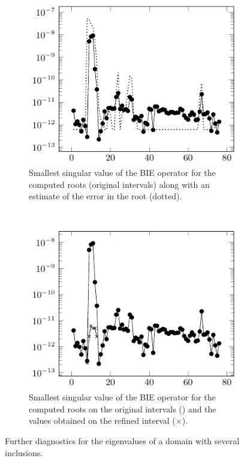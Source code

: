 %

\begin{figure}
  \centering
  \begin{subfigure}[t]{0.4\textwidth}
    \centering
    \includegraphics[width=\textwidth]{fig/ex_many_holes_004_sings_plot_west}
    \caption{Smallest singular value of the BIE operator
      for the computed roots (original intervals)
      along with an estimate of the error in the root (dotted).}
    \label{subfig:many_inclusions_sings_west}
  \end{subfigure}
  ~
  \begin{subfigure}[t]{0.4\textwidth}
    \centering
    \includegraphics[width=\textwidth]{fig/ex_many_holes_004_sings_plot_ref}
    \caption{Smallest singular value of the BIE operator
      for the computed roots on the original intervals (\textbullet)
      and the values obtained on the refined interval ($\times$).}
    \label{subfig:many_inclusions_sings_ref}
  \end{subfigure}
  \caption{Further diagnostics for the eigenvalues of a domain
    with several inclusions.}
  \label{fig:many_inclusions_diagnostics_2}
\end{figure}

